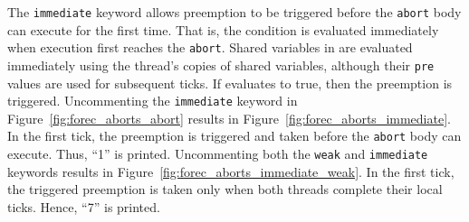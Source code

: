 The \verb$immediate$ keyword allows preemption to be
triggered before the \verb$abort$ body can execute for the
first time. That is, the condition \expression{} is
evaluated immediately when execution first reaches the
\verb$abort$. Shared variables in \expression{}
are evaluated immediately using the thread's copies of shared variables, 
although their \verb$pre$ values are used for subsequent ticks. 
If \expression{} evaluates to true, then the
preemption is triggered. Uncommenting the \verb$immediate$ keyword 
in Figure~\ref{fig:forec_aborts_abort} results in 
Figure~\ref{fig:forec_aborts_immediate}. In the first 
tick, the preemption is triggered and taken before the 
\verb$abort$ body can execute. Thus,
``1'' is printed. Uncommenting both the \verb$weak$ and 
\verb$immediate$ keywords results in 
Figure~\ref{fig:forec_aborts_immediate_weak}.
In the first tick, the triggered preemption is 
taken only when both threads complete their local ticks. 
Hence, ``7'' is printed.



